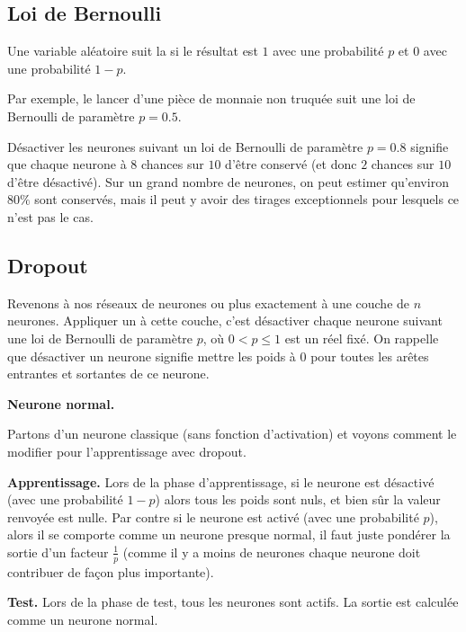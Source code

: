 \documentclass[11pt,class=report,crop=false]{standalone}
\begin{document}
\subsection{Loi de Bernoulli}

Une variable aléatoire suit la  si le résultat est $1$ avec une probabilité $p$ et $0$ avec une probabilité $1-p$.

Par exemple, le lancer d'une pièce de monnaie non truquée suit une loi de Bernoulli de paramètre $p=0.5$.

Désactiver les neurones suivant un loi de Bernoulli de paramètre $p=0.8$ signifie que chaque neurone à $8$ chances sur $10$ d'être conservé (et donc $2$ chances sur $10$ d'être désactivé).
Sur un grand nombre de neurones, on peut estimer qu'environ $80\%$ sont conservés, mais il peut y avoir des tirages exceptionnels pour lesquels ce n'est pas le cas.


\subsection{Dropout}

Revenons à nos réseaux de neurones ou plus exactement à une couche de $n$ neurones.
Appliquer un  à cette couche, c'est désactiver chaque neurone suivant une loi de Bernoulli de paramètre $p$, où $0 < p \le 1$ est un réel fixé.
On rappelle que désactiver un neurone signifie mettre les poids à $0$ pour toutes les arêtes entrantes et sortantes de ce neurone.


\textbf{Neurone \og{}normal\fg{}.}

Partons d'un neurone classique (sans fonction d'activation) et voyons comment le modifier pour l'apprentissage avec dropout.




\textbf{Apprentissage.}
Lors de la phase d'apprentissage, si le neurone est désactivé (avec une probabilité $1-p$) alors tous les poids sont nuls, et bien sûr la valeur renvoyée est nulle.
Par contre si le neurone est activé (avec une probabilité $p$), alors il se comporte comme un neurone \og{}presque normal\fg{}, il faut juste pondérer la sortie d'un facteur $\frac1p$ (comme il y a moins de neurones chaque neurone doit contribuer de façon plus importante).



\textbf{Test.}
Lors de la phase de test, tous les neurones sont actifs. La sortie est calculée comme un neurone normal.

\end{document}
